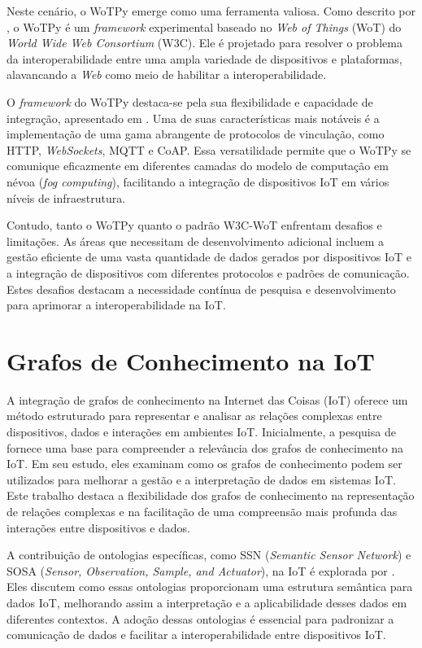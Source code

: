 Neste cenário, o WoTPy emerge como uma ferramenta valiosa. Como descrito por \cite{Garcia2019}, o WoTPy é um \textit{framework} experimental baseado no \textit{Web of Things} (WoT) do \textit{World Wide Web Consortium} (W3C). Ele é projetado para resolver o problema da interoperabilidade entre uma ampla variedade de dispositivos e plataformas, alavancando a \textit{Web} como meio de habilitar a interoperabilidade.

O \textit{framework} do WoTPy destaca-se pela sua flexibilidade e capacidade de integração, apresentado em \cite{Nakano2023}. Uma de suas características mais notáveis é a implementação de uma gama abrangente de protocolos de vinculação, como HTTP, \textit{WebSockets}, MQTT e CoAP. Essa versatilidade permite que o WoTPy se comunique eficazmente em diferentes camadas do modelo de computação em névoa (\textit{fog computing}), facilitando a integração de dispositivos IoT em vários níveis de infraestrutura.

Contudo, tanto o WoTPy quanto o padrão W3C-WoT enfrentam desafios e limitações. As áreas que necessitam de desenvolvimento adicional incluem a gestão eficiente de uma vasta quantidade de dados gerados por dispositivos IoT e a integração de dispositivos com diferentes protocolos e padrões de comunicação. Estes desafios destacam a necessidade contínua de pesquisa e desenvolvimento para aprimorar a interoperabilidade na IoT.

\section{Grafos de Conhecimento na IoT}

A integração de grafos de conhecimento na Internet das Coisas (IoT) oferece um método estruturado para representar e analisar as relações complexas entre dispositivos, dados e interações em ambientes IoT. Inicialmente, a pesquisa de \cite{Tsiatsis2018} fornece uma base para compreender a relevância dos grafos de conhecimento na IoT. Em seu estudo, eles examinam como os grafos de conhecimento podem ser utilizados para melhorar a gestão e a interpretação de dados em sistemas IoT. Este trabalho destaca a flexibilidade dos grafos de conhecimento na representação de relações complexas e na facilitação de uma compreensão mais profunda das interações entre dispositivos e dados.

A contribuição de ontologias específicas, como SSN (\textit{Semantic Sensor Network}) e SOSA (\textit{Sensor, Observation, Sample, and Actuator}), na IoT é explorada por \cite{Compton2012}. Eles discutem como essas ontologias proporcionam uma estrutura semântica para dados IoT, melhorando assim a interpretação e a aplicabilidade desses dados em diferentes contextos. A adoção dessas ontologias é essencial para padronizar a comunicação de dados e facilitar a interoperabilidade entre dispositivos IoT.

